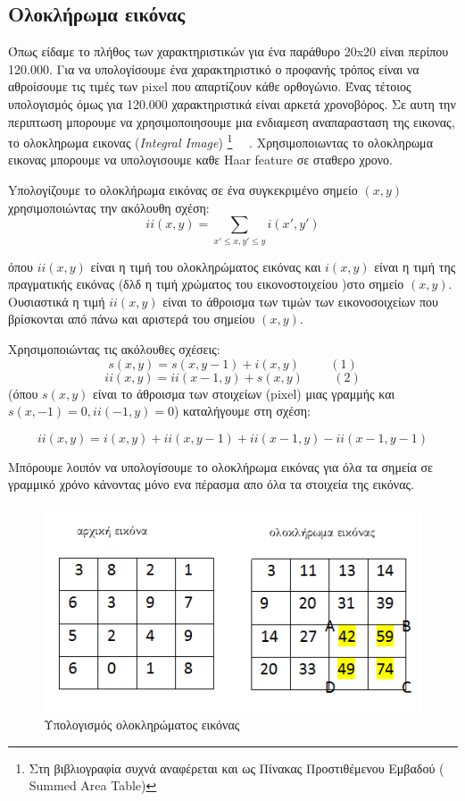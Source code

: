 \subsection{Ολοκλήρωμα εικόνας}

Όπως είδαμε το πλήθος των χαρακτηριστικών για ένα παράθυρο 20x20 είναι περίπου 120.000.
Για να υπολογίσουμε ένα χαρακτηριστικό ο προφανής τρόπος είναι να αθροίσουμε τις
τιμές των pixel που απαρτίζουν κάθε ορθογώνιο. Ένας τέτοιος υπολογισμός όμως για 120.000
χαρακτηριστικά είναι αρκετά χρονοβόρος. Σε αυτη την περιπτωση μπορουμε να χρησιμοποιησουμε
μια ενδιαμεση αναπαρασταση της εικονας, το ολοκληρωμα εικονας (\emph{Integral Image})
\footnote{Στη βιβλιογραφία συχνά αναφέρεται και ως Πίνακας Προστιθέμενου Εμβαδού (
Summed Area Table)}
~\cite{Lienhart02anextended}~\cite{Lienhart2003}.
Χρησιμοποιωντας το ολοκληρωμα εικονας μπορουμε να υπολογισουμε καθε Haar feature
σε σταθερο χρονο.

Yπολογίζουμε το ολοκλήρωμα εικόνας σε ένα συγκεκριμένο σημείο $(x,y)$
χρησιμοποιώντας την ακόλουθη σχέση:
$$
ii(x,y) = \displaystyle\sum_{x'\leq x, y'\leq y} i(x',y')
$$

όπου $ii(x,y)$ είναι η τιμή του ολοκληρώματος εικόνας και $i(x,y)$ είναι η τιμή
της πραγματικής εικόνας (δλδ η τιμή χρώματος του εικονοστοιχείου )στο σημείο $(x,y)$.
Ουσιαστικά η τιμή $ii(x,y)$ είναι το άθροισμα των τιμών των εικονοσοιχείων που
βρίσκονται από πάνω και αριστερά του σημείου $(x,y)$.

Χρησιμοποιώντας τις ακόλουθες σχέσεις:
$$
s(x,y) = s(x,y-1) + i(x,y) \hspace{1cm} (1)
$$
$$
ii(x,y) = ii(x-1,y) + s(x,y) \hspace{1cm} (2)
$$
(όπου $s(x,y)$ είναι το άθροισμα των στοιχείων (pixel) μιας γραμμής και $s(x, -1)=0, ii(-1,y)=0$)
καταλήγουμε στη σχέση:

$$
ii(x,y) = i(x,y) + ii(x,y-1) + ii(x-1,y) - ii(x-1,y-1)
$$

Μπόρουμε λοιπόν να υπολογίσουμε το ολοκλήρωμα εικόνας για όλα τα σημεία σε γραμμικό
χρόνο κάνοντας μόνο ενα πέρασμα απο όλα τα στοιχεία της εικόνας.

\begin{figure}[htbp]
  \begin{center}
    \includegraphics[width=1.0\maxwidth]{../figures/integrimgr3.png}
    \caption{Υπολογισμός ολοκληρώματος εικόνας\label{fig:integrimg}}
   \end{center}
\end{figure}


